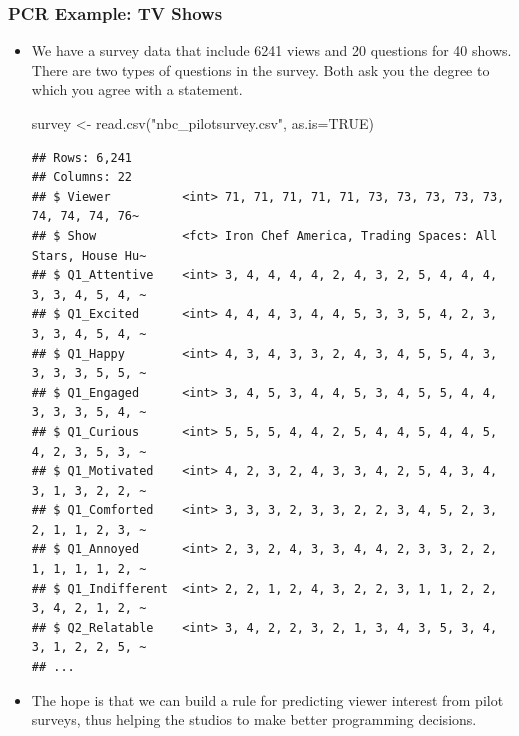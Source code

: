 \documentclass[
  shownotes,
  xcolor={svgnames},
  hyperref={colorlinks,citecolor=DarkBlue,linkcolor=DarkRed,urlcolor=DarkBlue}
  , aspectratio=169]{beamer}
\newenvironment{Shaded}{\begin{snugshade}}{\end{snugshade}}
\newcommand{\AttributeTok}[1]{\textcolor[rgb]{0.77,0.63,0.00}{#1}}
\newcommand{\ConstantTok}[1]{\textcolor[rgb]{0.00,0.00,0.00}{#1}}
\newcommand{\FunctionTok}[1]{\textcolor[rgb]{0.00,0.00,0.00}{#1}}
\newcommand{\NormalTok}[1]{#1}
\newcommand{\OtherTok}[1]{\textcolor[rgb]{0.56,0.35,0.01}{#1}}
\newcommand{\StringTok}[1]{\textcolor[rgb]{0.31,0.60,0.02}{#1}}
\begin{document}
\begin{frame}[fragile]
\frametitle{PCR Example: TV Shows}

\begin{itemize}
  \item We have a survey data that include 6241 views and 20 questions for 40 shows. There are two types of questions in the survey. Both ask you the degree to which you agree with a statement. 

\begin{scriptsize}
\begin{Shaded}
\begin{Highlighting}[]
\NormalTok{survey }\OtherTok{\textless{}{-}} \FunctionTok{read.csv}\NormalTok{(}\StringTok{"nbc\_pilotsurvey.csv"}\NormalTok{, }\AttributeTok{as.is=}\ConstantTok{TRUE}\NormalTok{) }
\end{Highlighting}
\end{Shaded}
\end{scriptsize}
\begin{tiny}

\begin{verbatim}
## Rows: 6,241
## Columns: 22
## $ Viewer          <int> 71, 71, 71, 71, 71, 73, 73, 73, 73, 73, 74, 74, 74, 76~
## $ Show            <fct> Iron Chef America, Trading Spaces: All Stars, House Hu~
## $ Q1_Attentive    <int> 3, 4, 4, 4, 4, 2, 4, 3, 2, 5, 4, 4, 4, 3, 3, 4, 5, 4, ~
## $ Q1_Excited      <int> 4, 4, 4, 3, 4, 4, 5, 3, 3, 5, 4, 2, 3, 3, 3, 4, 5, 4, ~
## $ Q1_Happy        <int> 4, 3, 4, 3, 3, 2, 4, 3, 4, 5, 5, 4, 3, 3, 3, 3, 5, 5, ~
## $ Q1_Engaged      <int> 3, 4, 5, 3, 4, 4, 5, 3, 4, 5, 5, 4, 4, 3, 3, 3, 5, 4, ~
## $ Q1_Curious      <int> 5, 5, 5, 4, 4, 2, 5, 4, 4, 5, 4, 4, 5, 4, 2, 3, 5, 3, ~
## $ Q1_Motivated    <int> 4, 2, 3, 2, 4, 3, 3, 4, 2, 5, 4, 3, 4, 3, 1, 3, 2, 2, ~
## $ Q1_Comforted    <int> 3, 3, 3, 2, 3, 3, 2, 2, 3, 4, 5, 2, 3, 2, 1, 1, 2, 3, ~
## $ Q1_Annoyed      <int> 2, 3, 2, 4, 3, 3, 4, 4, 2, 3, 3, 2, 2, 1, 1, 1, 1, 2, ~
## $ Q1_Indifferent  <int> 2, 2, 1, 2, 4, 3, 2, 2, 3, 1, 1, 2, 2, 3, 4, 2, 1, 2, ~
## $ Q2_Relatable    <int> 3, 4, 2, 2, 3, 2, 1, 3, 4, 3, 5, 3, 4, 3, 1, 2, 2, 5, ~
## ...
\end{verbatim}
\end{tiny}

\item The hope is that we can build a rule for predicting viewer interest from pilot surveys, thus helping the studios to make better programming decisions. 
\end{itemize}

\end{frame}
\end{document}
